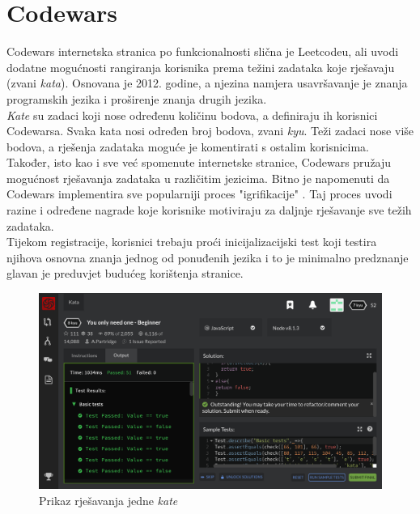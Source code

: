 \documentclass[times, utf8, zavrsni]{fer}
\begin{document}
		\section{Codewars}
		Codewars internetska stranica po funkcionalnosti slična je Leetcodeu, ali uvodi dodatne mogućnosti rangiranja korisnika prema težini zadataka koje rješavaju (zvani \textit{kata}). Osnovana je 2012. godine, a  njezina namjera usavršavanje je znanja programskih jezika i proširenje znanja drugih jezika.\\
		\textit{Kate} su zadaci koji nose određenu količinu bodova, a definiraju ih korisnici Codewarsa. Svaka kata nosi određen broj bodova, zvani \textit{kyu}. Teži zadaci nose više bodova, a rješenja zadataka moguće je komentirati s ostalim korisnicima. Također, isto kao i sve već spomenute internetske stranice, Codewars pružaju mogućnost rješavanja zadataka u različitim jezicima. Bitno je napomenuti da Codewars implementira sve popularniji proces "igrifikacije" . Taj proces uvodi razine i određene nagrade koje korisnike motiviraju za daljnje rješavanje sve težih zadataka.\\
		Tijekom registracije, korisnici trebaju proći inicijalizacijski test koji testira njihova osnovna znanja jednog od ponuđenih jezika i to je minimalno predznanje glavan je preduvjet budućeg korištenja stranice.
		\begin{figure}[H]
			\centering
			\includegraphics[width=\linewidth]{pictures/prikazi/Codewars.png}
			\caption{Prikaz rješavanja jedne \textit{kate}}
			\label{fig:codewars}
		\end{figure}
	
\end{document}
